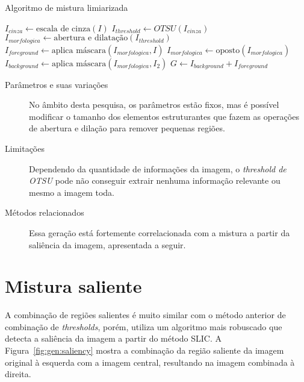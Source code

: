 \vspace{0.5cm}
\begin{algorithm}[!htbp]
  \caption{Algoritmo de mistura limiarizada}
  \label{alg:threshold}
  \SetAlgoLined

  $I_{cinza} \gets \text{escala de cinza}(I)$\;
  $I_{threshold} \gets OTSU(I_{cinza})$\;
  $I_{morfologica} \gets \text{abertura e dilatação} (I_{threshold})$\;
  $I_{foreground} \gets \text{aplica máscara}(I_{morfologica}, I) $\;
  $I_{morfologica} \gets \text{oposto}(I_{morfologica})$\;
  $I_{background} \gets \text{aplica máscara}(I_{morfologica}, I_2) $\;
  $G \gets I_{background} + I_{foreground}$\;
\end{algorithm}
\vspace{0.5cm}

\begin{description}
  \item[Parâmetros e suas variações] No âmbito desta pesquisa, os parâmetros estão fixos, mas é possível modificar o tamanho dos elementos estruturantes que fazem as operações de abertura e dilação para remover pequenas regiões.

  \item[Limitações] Dependendo da quantidade de informações da imagem, o \textit{threshold de OTSU} pode não conseguir extrair nenhuma informação relevante ou mesmo a imagem toda.

  \item[Métodos relacionados] Essa geração está fortemente correlacionada com a mistura a partir da saliência da imagem, apresentada a seguir.

\end{description}
\section{Mistura saliente}

A combinação de regiões salientes é muito similar com o método anterior de combinação de \textit{thresholds}, porém, utiliza um algoritmo mais robuscado que detecta a saliência da imagem a partir do método SLIC. A Figura~\ref{fig:gen:saliency} mostra a combinação da região saliente da imagem original à esquerda com a imagem central, resultando na imagem combinada à direita.

